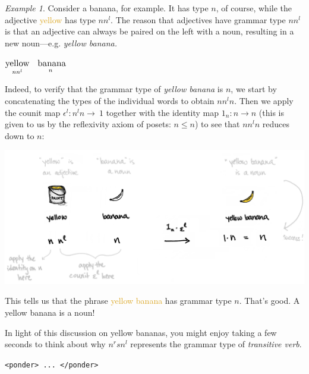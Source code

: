 \documentclass{tufte-handout-tai}
\theoremstyle{plain}
\theoremstyle{definition}
\theoremstyle{remark}
\newtheorem{ex}[thm]{Example}
\begin{document}
\begin{ex}
Consider a banana, for example. It has type $n$, of course, while the adjective \textcolor{Goldenrod}{yellow} has type $nn^l$. The reason that adjectives have grammar type $nn^l$ is that an adjective can always be paired on the left with a noun, resulting in a new noun---e.g. \textit{yellow banana.} 
\begin{center}
$\underset{nn^l}{\text{\large yellow}} \quad 
\underset{n^{\phantom{l}}}{\text{\large banana}}$
\end{center}
Indeed, to verify that the grammar type of \textit{yellow banana} is $n$, we start by concatenating the types of the individual words to obtain $nn^ln$. Then we apply the counit map $\epsilon^l\colon n^ln\to~1$ together with the identity map $1_n\colon n\to n$ (this is given to us by the reflexivity axiom of posets: $n\leq n$) to see that $nn^ln$ reduces down to $n$:
\begin{fullwidth}
\begin{center}
\includegraphics[width=!,totalheight=!,scale=0.5]{yellowbanana.jpg}
\end{center}
\end{fullwidth}
This tells us that the phrase \textcolor{Goldenrod}{yellow banana} has grammar type $n$. That's good. A yellow banana is a noun!  

In light of this discussion on yellow bananas, you might enjoy taking a few seconds to think about why $n^rsn^l$ represents the grammar type of \textit{transitive verb}.

\begin{center}
\noindent \texttt{<ponder> ... </ponder>} 
\end{center}


\end{ex}
\end{document}
